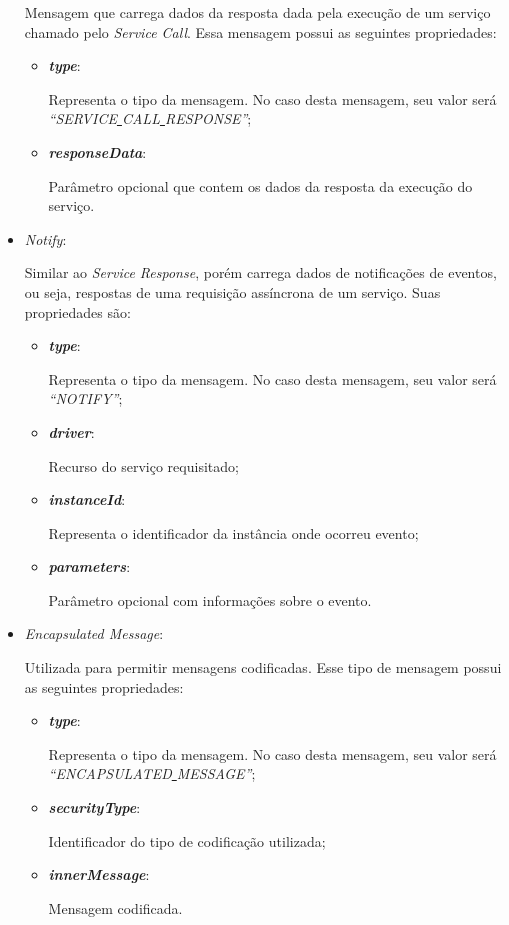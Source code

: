 \begin{itemize}
		Mensagem que carrega dados da resposta dada pela execução de um serviço chamado pelo \emph{Service Call}. Essa mensagem possui as seguintes propriedades:
		\begin{itemize}
			\item \emph{\bf{type}}: 

				Representa o tipo da mensagem. No caso desta mensagem, seu valor será \emph{``SERVICE\underline{ }CALL\underline{ }RESPONSE''};
			\item \emph{\bf{responseData}}: 

				Parâmetro opcional que contem os dados da resposta da execução do serviço.
		\end{itemize}
	\item \emph{Notify}: 

		Similar ao \emph{Service Response}, porém carrega dados de notificações de eventos, ou seja, respostas de uma requisição assíncrona de um serviço. Suas propriedades são:
		\begin{itemize}
			\item \emph{\bf{type}}: 

				Representa o tipo da mensagem. No caso desta mensagem, seu valor será \emph{``NOTIFY''};
			\item \emph{\bf{driver}}: 

				Recurso do serviço requisitado;
			\item \emph{\bf{instanceId}}: 

				Representa o identificador da instância onde ocorreu evento;
			\item \emph{\bf{parameters}}: 

				Parâmetro opcional com informações sobre o evento.
		\end{itemize}
	\item \emph{Encapsulated Message}: 

		Utilizada para permitir mensagens codificadas. Esse tipo de mensagem possui as seguintes propriedades:
		\begin{itemize}
			\item \emph{\bf{type}}: 

				Representa o tipo da mensagem. No caso desta mensagem, seu valor será \emph{``ENCAPSULATED\underline{ }MESSAGE''};
			\item \emph{\bf{securityType}}: 

				Identificador do tipo de codificação utilizada;
			\item \emph{\bf{innerMessage}}: 

				Mensagem codificada.
		\end{itemize}
\end{itemize}

